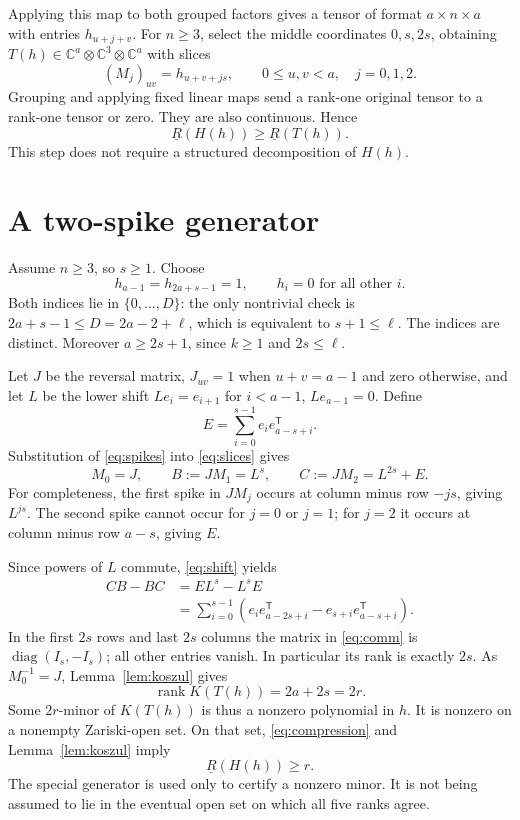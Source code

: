 \documentclass[11pt]{article}
\newcommand{\C}{\mathbb C}
\newcommand{\brk}{\underline{R}}
\DeclareMathOperator{\rank}{rank}
\begin{document}
Applying this map to both grouped factors gives a tensor of format
$a\times n\times a$ with entries $h_{u+j+v}$. For $n\ge3$, select the
middle coordinates $0,s,2s$, obtaining $T(h)\in\C^a\otimes\C^3\otimes\C^a$
with slices
\begin{equation}\label{eq:slices}
 (M_j)_{uv}=h_{u+v+js},\qquad 0\le u,v<a,\quad j=0,1,2.
\end{equation}
Grouping and applying fixed linear maps send a rank-one original tensor
to a rank-one tensor or zero. They are also continuous. Hence
\begin{equation}\label{eq:compression}
 \brk(H(h))\ge\brk(T(h)).
\end{equation}
This step does not require a structured decomposition of $H(h)$.

\section{A two-spike generator}
Assume $n\ge3$, so $s\ge1$. Choose
\begin{equation}\label{eq:spikes}
 h_{a-1}=h_{2a+s-1}=1,\qquad h_i=0\text{ for all other }i.
\end{equation}
Both indices lie in $\{0,\ldots,D\}$: the only nontrivial check is
$2a+s-1\le D=2a-2+\ell$, which is equivalent to $s+1\le\ell$.
The indices are distinct. Moreover $a\ge2s+1$, since $k\ge1$ and
$2s\le\ell$.

Let $J$ be the reversal matrix, $J_{uv}=1$ when $u+v=a-1$ and zero
otherwise, and let $L$ be the lower shift $Le_i=e_{i+1}$ for $i<a-1$,
$Le_{a-1}=0$. Define
\[
 E=\sum_{i=0}^{s-1}e_i e_{a-s+i}^{\mathsf T}.
\]
Substitution of \eqref{eq:spikes} into \eqref{eq:slices} gives
\begin{equation}\label{eq:shift}
 M_0=J,\qquad B:=JM_1=L^s,\qquad C:=JM_2=L^{2s}+E.
\end{equation}
For completeness, the first spike in $JM_j$ occurs at column minus row
$-js$, giving $L^{js}$. The second spike cannot occur for $j=0$ or $j=1$;
for $j=2$ it occurs at column minus row $a-s$, giving $E$.

Since powers of $L$ commute, \eqref{eq:shift} yields
\begin{align}\label{eq:comm}
 CB-BC
 &=EL^s-L^sE\nonumber\\
 &=\sum_{i=0}^{s-1}\left(
 e_i e_{a-2s+i}^{\mathsf T}
 -e_{s+i}e_{a-s+i}^{\mathsf T}\right).
\end{align}
In the first $2s$ rows and last $2s$ columns the matrix in
\eqref{eq:comm} is $\operatorname{diag}(I_s,-I_s)$; all other entries
vanish. In particular its rank is exactly $2s$. As $M_0^{-1}=J$,
Lemma~\ref{lem:koszul} gives
\[
 \rank K(T(h))=2a+2s=2r.
\]
Some $2r$-minor of $K(T(h))$ is thus a nonzero polynomial in $h$.
It is nonzero on a nonempty Zariski-open set. On that set,
\eqref{eq:compression} and Lemma~\ref{lem:koszul} imply
\begin{equation}\label{eq:lower}
 \brk(H(h))\ge r.
\end{equation}
The special generator is used only to certify a nonzero minor. It is
not being assumed to lie in the eventual open set on which all five
ranks agree.
\end{document}
